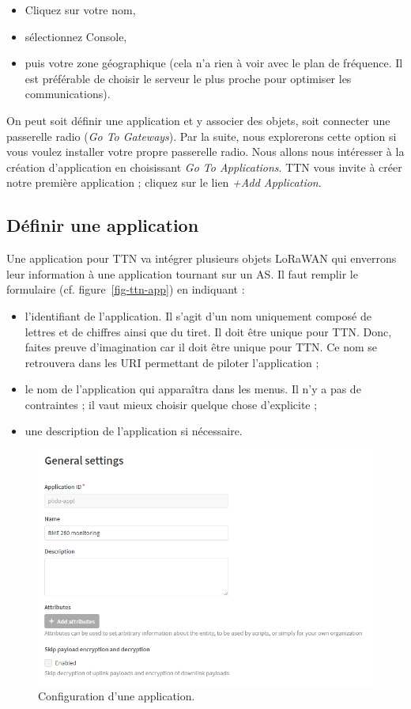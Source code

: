 \begin{itemize}
    \item Cliquez sur votre nom,
    \item sélectionnez Console,
    \item puis votre zone géographique (cela n'a rien à voir avec le plan de fréquence. Il est préférable de choisir le serveur le plus proche pour optimiser les communications).
\end{itemize}


On peut soit définir une application et y associer des objets, soit connecter une passerelle radio (\textit{Go To Gateways}). Par la suite, nous explorerons cette option si vous voulez installer votre propre passerelle radio. Nous allons nous intéresser à la création d'application en choisissant \textit{Go To Applications}. TTN vous invite à créer notre première application ; cliquez sur le lien \textit{+Add Application}.

\subsection*{Définir une application}

Une application pour TTN va intégrer plusieurs objets LoRaWAN qui enverrons leur information à une application tournant sur un \ac{AS}. 
Il faut remplir le formulaire (cf. figure~\vref{fig-ttn-app}) en indiquant :
\begin{itemize}
    \item l'identifiant de l'application. Il s'agit d'un nom uniquement composé de lettres et de chiffres ainsi que du tiret. Il doit être unique pour TTN. Donc, faites preuve d'imagination car il doit être unique pour TTN. Ce nom se retrouvera dans les URI permettant de piloter l'application ;
    \item le nom de l'application qui apparaîtra dans les menus. Il n'y a pas de contraintes ; il vaut mieux choisir quelque chose d'explicite ;
    \item une description de l'application si nécessaire.
\end{itemize}

\begin{figure}[tbp]
\centerline{\includegraphics[width=0.7\columnwidth]{Pictures/ttn-app.png} }
\caption{Configuration d'une application.}
\label{fig-ttn-app}
\end{figure}

